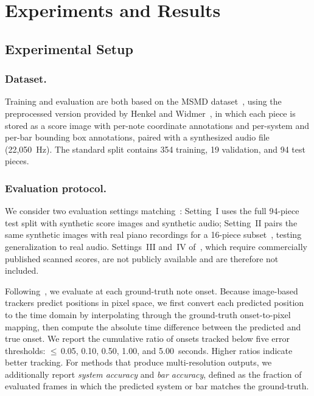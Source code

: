 \section{Experiments and Results}\label{sec:eval}

\subsection{Experimental Setup}\label{sec:setup}
 
\subsubsection{Dataset.}
Training and evaluation are both based on the MSMD dataset~\cite{dorfer2018learning}, using the preprocessed version provided by Henkel and Widmer~\cite{henkel2021real}, in which each piece is stored as a score image with per-note coordinate annotations and per-system and per-bar bounding box annotations, paired with a synthesized audio file (22,050~Hz). The standard split contains 354 training, 19 validation, and 94 test pieces.
 
\subsubsection{Evaluation protocol.}
We consider two evaluation settings matching~\cite{henkel2021real}: 
Setting~I uses the full 94-piece test split with synthetic score images 
and synthetic audio; Setting~II pairs the same synthetic images with real 
piano recordings for a 16-piece subset~\cite{henkel2019score}, testing 
generalization to real audio. Settings~III and~IV of~\cite{henkel2021real}, 
which require commercially published scanned scores, are not publicly 
available and are therefore not included.

Following~\cite{henkel2021real}, we evaluate at each ground-truth note onset.
Because image-based trackers predict positions in pixel space, we first convert each predicted position to the time domain by interpolating through the ground-truth onset-to-pixel mapping, then compute the absolute time difference between the predicted and true onset. We report the cumulative ratio of onsets tracked below five error thresholds: $\leq$\,0.05, 0.10, 0.50, 1.00, and 5.00~seconds. Higher ratios indicate better tracking. For methods that produce multi-resolution outputs, we additionally report \emph{system accuracy} and \emph{bar accuracy}, defined as the fraction of evaluated frames in which the predicted system or bar matches the ground-truth.
 
